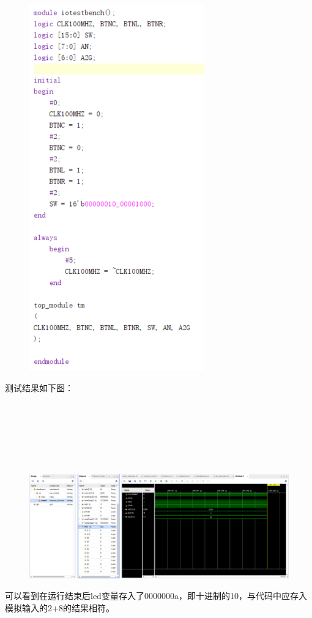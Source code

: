 \documentclass[UTF8]{article}
\begin{document}
\begin{enumerate}
			\begin{figure}[htbp]
				\centering
				\includegraphics[scale=0.6]{2-3-3.png}
			\end{figure}
			\par 测试结果如下图：\\\\\\\\\\\\\\
			
			\begin{figure}[htbp]
				\centering
				\includegraphics[scale=0.2]{2-3-4.png}
			\end{figure}
			\par 可以看到在运行结束后led变量存入了0000000a，即十进制的10，与代码中应存入模拟输入的2+8的结果相符。
			

\end{enumerate}
\end{document}
